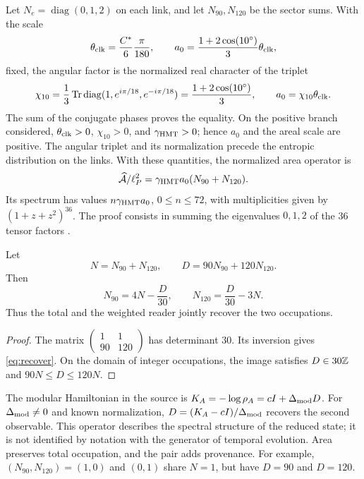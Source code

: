 Let $N_e=\operatorname{diag}(0,1,2)$ on each link, and let
$N_{90},N_{120}$ be the sector sums. With the scale
\[
\theta_{\rm clk}=\frac{C^*}{6}\frac{\pi}{180},\qquad
a_0=\frac{1+2\cos(10^\circ)}3\theta_{\rm clk},
\]
fixed, the angular factor is the normalized real character of the triplet
\begin{equation}
 \chi_{10}=\frac13\operatorname{Tr}\operatorname{diag}
       (1,e^{i\pi/18},e^{-i\pi/18})
 =\frac{1+2\cos(10^\circ)}3,
 \qquad a_0=\chi_{10}\theta_{\rm clk}.
 \label{eq:ii-area-caracter-triplete}
\end{equation}
The sum of the conjugate phases proves the equality. On the positive branch
considered, \(\theta_{\rm clk}>0\), \(\chi_{10}>0\), and
\(\gamma_{\mathrm{HMT}}>0\); hence \(a_0\) and the areal scale are
positive. The angular triplet and its normalization precede the
entropic distribution on the links. With these quantities,
the normalized area operator is
\[
\widehat{\mathcal A}/\ell_P^2
=\gamma_{\mathrm{HMT}}a_0(N_{90}+N_{120}).
\]
Its spectrum has values $n\gamma_{\mathrm{HMT}}a_0$, $0\le n\le72$,
with multiplicities given by $(1+z+z^2)^{36}$.
The proof consists in summing the eigenvalues $0,1,2$ of the
36 tensor factors \cite{area}.

\begin{theorem}
Let
\[
N=N_{90}+N_{120},\qquad D=90N_{90}+120N_{120}.
\]
Then
\begin{equation}
N_{90}=4N-\frac D{30},\qquad
N_{120}=\frac D{30}-3N.
\label{eq:recover}
\end{equation}
Thus the total and the weighted reader jointly recover
the two occupations.
\end{theorem}
\begin{proof}
The matrix $\left(\begin{smallmatrix}1&1\\90&120\end{smallmatrix}\right)$
has determinant $30$. Its inversion gives \eqref{eq:recover}.
On the domain of integer occupations, the image satisfies
$D\in30\mathbb Z$ and $90N\le D\le120N$.
\end{proof}

The modular Hamiltonian in the source is
$K_A=-\log\rho_A=cI+\Delta_{\rm mod}D$.
For $\Delta_{\rm mod}\ne0$ and known normalization,
$D=(K_A-cI)/\Delta_{\rm mod}$ recovers the second observable.
This operator describes the spectral structure of the reduced state;
it is not identified by notation with the generator of temporal evolution.
Area preserves total occupation, and the pair adds provenance.
For example, $(N_{90},N_{120})=(1,0)$ and $(0,1)$ share $N=1$,
but have $D=90$ and $D=120$.

